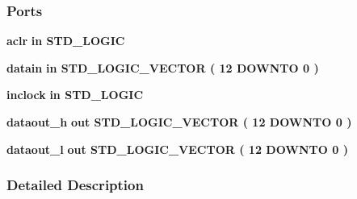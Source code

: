 \subsubsection*{Ports}
 \begin{DoxyCompactItemize}
\item 
{\bf aclr}  {\bfseries {\bfseries \textcolor{keywordflow}{in}\textcolor{vhdlchar}{ }}} {\bfseries \textcolor{comment}{S\+T\+D\+\_\+\+L\+O\+G\+IC}\textcolor{vhdlchar}{ }} 
\item 
{\bf datain}  {\bfseries {\bfseries \textcolor{keywordflow}{in}\textcolor{vhdlchar}{ }}} {\bfseries \textcolor{comment}{S\+T\+D\+\_\+\+L\+O\+G\+I\+C\+\_\+\+V\+E\+C\+T\+OR}\textcolor{vhdlchar}{ }\textcolor{vhdlchar}{(}\textcolor{vhdlchar}{ }\textcolor{vhdlchar}{ } \textcolor{vhdldigit}{12} \textcolor{vhdlchar}{ }\textcolor{keywordflow}{D\+O\+W\+N\+TO}\textcolor{vhdlchar}{ }\textcolor{vhdlchar}{ } \textcolor{vhdldigit}{0} \textcolor{vhdlchar}{ }\textcolor{vhdlchar}{)}\textcolor{vhdlchar}{ }} 
\item 
{\bf inclock}  {\bfseries {\bfseries \textcolor{keywordflow}{in}\textcolor{vhdlchar}{ }}} {\bfseries \textcolor{comment}{S\+T\+D\+\_\+\+L\+O\+G\+IC}\textcolor{vhdlchar}{ }} 
\item 
{\bf dataout\+\_\+h}  {\bfseries {\bfseries \textcolor{keywordflow}{out}\textcolor{vhdlchar}{ }}} {\bfseries \textcolor{comment}{S\+T\+D\+\_\+\+L\+O\+G\+I\+C\+\_\+\+V\+E\+C\+T\+OR}\textcolor{vhdlchar}{ }\textcolor{vhdlchar}{(}\textcolor{vhdlchar}{ }\textcolor{vhdlchar}{ } \textcolor{vhdldigit}{12} \textcolor{vhdlchar}{ }\textcolor{keywordflow}{D\+O\+W\+N\+TO}\textcolor{vhdlchar}{ }\textcolor{vhdlchar}{ } \textcolor{vhdldigit}{0} \textcolor{vhdlchar}{ }\textcolor{vhdlchar}{)}\textcolor{vhdlchar}{ }} 
\item 
{\bf dataout\+\_\+l}  {\bfseries {\bfseries \textcolor{keywordflow}{out}\textcolor{vhdlchar}{ }}} {\bfseries \textcolor{comment}{S\+T\+D\+\_\+\+L\+O\+G\+I\+C\+\_\+\+V\+E\+C\+T\+OR}\textcolor{vhdlchar}{ }\textcolor{vhdlchar}{(}\textcolor{vhdlchar}{ }\textcolor{vhdlchar}{ } \textcolor{vhdldigit}{12} \textcolor{vhdlchar}{ }\textcolor{keywordflow}{D\+O\+W\+N\+TO}\textcolor{vhdlchar}{ }\textcolor{vhdlchar}{ } \textcolor{vhdldigit}{0} \textcolor{vhdlchar}{ }\textcolor{vhdlchar}{)}\textcolor{vhdlchar}{ }} 
\end{DoxyCompactItemize}


\subsubsection{Detailed Description}


